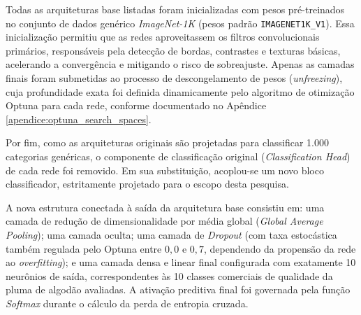     Todas as arquiteturas base listadas foram inicializadas com pesos pré-treinados no conjunto de dados genérico \textit{ImageNet-1K} (pesos padrão \texttt{IMAGENET1K\_V1}). Essa inicialização permitiu que as redes aproveitassem os filtros convolucionais primários, responsáveis pela detecção de bordas, contrastes e texturas básicas, acelerando a convergência e mitigando o risco de sobreajuste. Apenas as camadas finais foram submetidas ao processo de descongelamento de pesos (\textit{unfreezing}), cuja profundidade exata foi definida dinamicamente pelo algoritmo de otimização Optuna \cite{akiba2019optuna} para cada rede, conforme documentado no Apêndice \ref{apendice:optuna_search_spaces}.

    Por fim, como as arquiteturas originais são projetadas para classificar 1.000 categorias genéricas, o componente de classificação original (\textit{Classification Head}) de cada rede foi removido. Em sua substituição, acoplou-se um novo bloco classificador, estritamente projetado para o escopo desta pesquisa. 
    
    A nova estrutura conectada à saída da arquitetura base consistiu em: uma camada de redução de dimensionalidade por média global (\textit{Global Average Pooling}); uma camada oculta; uma camada de \textit{Dropout} (com taxa estocástica também regulada pelo Optuna entre $0,0$ e $0,7$, dependendo da propensão da rede ao \textit{overfitting}); e uma camada densa e linear final configurada com exatamente 10 neurônios de saída, correspondentes às 10 classes comerciais de qualidade da pluma de algodão avaliadas. A ativação preditiva final foi governada pela função \textit{Softmax} durante o cálculo da perda de entropia cruzada.